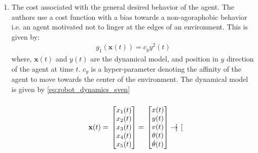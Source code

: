 \begin{enumerate}
	\item The cost associated with the general desired behavior of the agent. The authors use a cost function with a bias towards a non-agoraphobic behavior i.e. an agent motivated not to linger at the edges of an environment. This is given by:
	\begin{align}
	g_{1}(\textbf{x}(t)) = c_{y}y^{2}(t)
	\end{align}
	where, $\textbf{x}(t)$ and $y(t)$ are the dynamical model, and position in $y$ direction of the agent at time $t$. $c_y$ is a hyper-parameter denoting the affinity of the agent to move towards the center of the environment. The dynamical model is given by \autoref{eq:robot_dynamics_sven}

	\begin{equation}
	\label{eq:robot_dynamics_sven}
	\textbf{x}(t) = 
	{%
		\vphantom{\begin{bmatrix}0\\0\\0\\0\\0\\0\end{bmatrix}}
		\begin{bmatrix}
		x_1(t)\\x_2(t)\\x_3(t)\\x_4(t)\\x_5(t)\\
		\end{bmatrix}
	}
	=
		{%
		\vphantom{\begin{bmatrix}0\\0\\0\\0\\0\end{bmatrix}}
		\begin{bmatrix}
		x(t)\\y(t)\\v(t)\\\theta(t)\\\dot{\theta}(t)
		\end{bmatrix}}	
	\rightarrow
			{%
		\vphantom{\begin{bmatrix}0\\0\\0\\0\\0\end{bmatrix}}
		\begin{bmatrix}

\end{bmatrix}}
\end{equation}
\end{enumerate}
